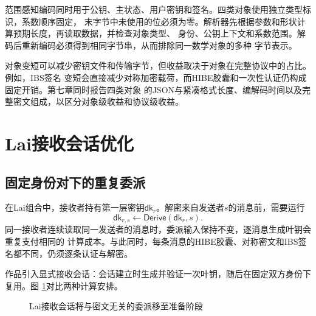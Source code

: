 范围感知编码同时用于公钥、主状态、用户密钥和签名。四类对象使用独立类型标识，系数顺序固定，
末字节中未使用的位必须为零。解析器先根据参数和形状计算预期长度，再读取数据，并检查对象类型、
身份、公钥上下文和系数范围。解码后重新编码必须得到相同字节串，从而排除同一数学对象的多种
字节表示。

对象变短可以减少密钥文件和传输字节，但收益取决于对象在完整协议中的占比。例如，IBS签名
变短会直接减少对称加密载荷，而HIBE胶囊和一次性认证仍构成固定开销。第七章同时报告四类对象
的JSON与紧凑格式长度、编解码时间以及完整密文组成，以区分对象级收益和协议级收益。

\section{Lai接收会话优化}
\label{sec:lai-session}

\subsection{固定身份对下的重复委派}

在Lai组合中，接收者持有第一层密钥$\mathsf{dk}_r$。解密来自发送者$s$的消息前，需要运行
\[
 \mathsf{dk}_{r,s}\leftarrow\mathsf{Derive}(\mathsf{dk}_r,s).
\]
同一接收者连续读取同一发送者的消息时，委派输入保持不变，逐消息生成叶钥会重复支付相同的
计算成本。与此同时，每条消息的HIBE胶囊、对称密文和IBS签名都不同，仍须逐条认证与解密。

作品引入显式接收会话：会话建立时生成并验证一次叶钥，随后在固定双方身份下复用。图
\ref{fig:receiver-session}对比两种计算安排。

\begin{figure}[H]
\centering
{}
\caption{Lai接收会话将与密文无关的委派移至准备阶段}
\label{fig:receiver-session}
\end{figure}

